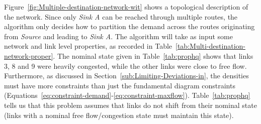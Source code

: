 Figure~\ref{fig:Multiple-destination-network-wit} shows a topological
description of the network. Since only \emph{Sink A }can be reached
through multiple routes, the algorithm only decides how to partition
the demand across the routes originating from \emph{Source} and leading
to \emph{Sink A}. The algorithm will take as input some network and
link level properties, as recorded in Table~\ref{tab:Multi-destination-network-proper}.
The nominal state given in Table~\ref{tab:prophq} shows that links
3, 8 and 9 were heavily congested, while the other links were close
to free flow. Furthermore, as discussed in Section~\ref{sub:Limiting-Deviations-in},
the densities must have more constraints than just the fundamental
diagram constraints (Equations~\eqref{eq:constraint-demand}-\eqref{eq:constraint-maxflow}).
Table~\ref{tab:prophq} tells us that this problem assumes that links
do not shift from their nominal state (links with a nominal free flow/congestion
state must maintain this state).
